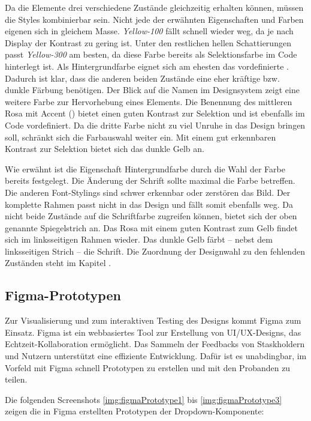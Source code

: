 Da die Elemente drei verschiedene Zustände gleichzeitig erhalten können, müssen die Styles kombinierbar sein.
Nicht jede der erwähnten Eigenschaften und Farben eigenen sich in gleichem Masse.
\emph{Yellow-100} fällt schnell wieder weg, da je nach Display der Kontrast zu gering ist.
Unter den restlichen hellen Schattierungen passt \emph{Yellow-300} am besten, da diese Farbe bereits als Selektionsfarbe im Code hinterlegt ist.
Als Hintergrundfarbe eignet sich am ehesten das vordefinierte . 
Dadurch ist klar, dass die anderen beiden Zustände eine eher kräftige bzw. dunkle Färbung benötigen.
Der Blick auf die Namen im Designsystem zeigt eine weitere Farbe zur Hervorhebung eines Elements.
Die Benennung des mittleren Rosa mit Accent () bietet einen guten Kontrast zur Selektion und ist ebenfalls im Code vordefiniert.
Da die dritte Farbe nicht zu viel Unruhe in das Design bringen soll, schränkt sich die Farbauswahl weiter ein.
Mit einem gut erkennbaren Kontrast zur Selektion bietet sich das dunkle Gelb  an.

Wie erwähnt ist die Eigenschaft Hintergrundfarbe durch die Wahl der Farbe bereits festgelegt. 
Die Änderung der Schrift sollte maximal die Farbe betreffen. 
Die anderen Font-Stylings sind schwer erkennbar oder zerstören das Bild.
Der komplette Rahmen passt nicht in das Design und fällt somit ebenfalls weg.
Da nicht beide Zustände auf die Schriftfarbe zugreifen können, bietet sich der oben genannte Spiegelstrich an.
Das Rosa mit einem guten Kontrast zum Gelb findet sich im linksseitigen Rahmen wieder.
Das dunkle Gelb färbt – nebst dem linksseitigen Strich – die Schrift.
Die Zuordnung der Designwahl zu den fehlenden Zuständen steht im Kapitel \textbf{}.


\clearpage
\subsection{Figma-Prototypen}
\label{sec:figmaPrototype}

Zur Visualisierung und zum interaktiven Testing des Designs kommt Figma zum Einsatz. 
Figma ist ein webbasiertes Tool zur Erstellung von UI/UX-Designs, das Echtzeit-Kollaboration ermöglicht. 
Das Sammeln der Feedbacks von Staskholdern und Nutzern unterstützt eine effiziente Entwicklung.
Dafür ist es unabdingbar, im Vorfeld mit Figma schnell Prototypen zu erstellen und mit den Probanden zu teilen.

Die folgenden Screenshots \ref{img:figmaPrototype1} bis \ref{img:figmaPrototype3} zeigen die in Figma erstellten Prototypen der Dropdown-Komponente:

